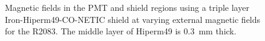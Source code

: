 \documentclass[12pt]{article}
\begin{document}
\begin{figure}[ht]
\qquad
{}
\caption{\small{Magnetic fields in the PMT and shield regions using a triple layer Iron-Hiperm49-CO-NETIC shield at varying external magnetic fields for the R2083. The middle layer of Hiperm49 is 0.3~mm thick.}}\label{R2083_Initial_Iron}
\end{figure}
\end{document}
